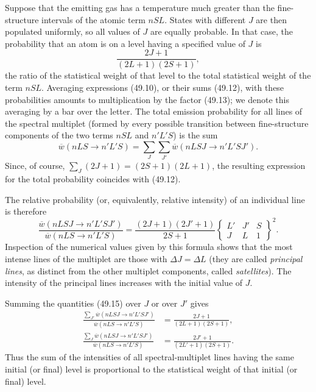 Suppose that the emitting gas has a temperature much greater than the fine-structure intervals of the atomic term $nSL$. States with different $J$ are then populated uniformly, so all values of $J$ are equally probable. In that case, the probability that an atom is on a level having a specified value of $J$ is
\begin{equation}
\frac{2J+1}{(2L+1)(2S+1)},
\tag{49.13}
\end{equation}
the ratio of the statistical weight of that level to the total statistical weight of the term $nSL$. Averaging expressions (49.10), or their sums (49.12), with these probabilities amounts to multiplication by the factor (49.13); we denote this averaging by a bar over the letter. The total emission probability for all lines of the spectral multiplet (formed by every possible transition between fine-structure components of the two terms $nSL$ and $n'L'S$) is the sum
\begin{equation}
\overline w(nLS\to n'L'S)=\sum_J\sum_{J'}
\overline w(nLSJ\to n'L'SJ').
\tag{49.14}
\end{equation}
Since, of course, $\sum_J(2J+1)=(2S+1)(2L+1)$, the resulting expression for the total probability coincides with (49.12).

The relative probability (or, equivalently, relative intensity) of an individual line is therefore
\begin{equation}
\frac{\overline w(nLSJ\to n'L'SJ')}{\overline w(nLS\to n'L'S)}
=\frac{(2J+1)(2J'+1)}{2S+1}
\begin{Bmatrix}L'&J'&S\\J&L&1\end{Bmatrix}^{\!2}.
\tag{49.15}
\end{equation}
Inspection of the numerical values given by this formula shows that the most intense lines of the multiplet are those with $\Delta J=\Delta L$ (they are called \emph{principal lines}, as distinct from the other multiplet components, called \emph{satellites}). The intensity of the principal lines increases with the initial value of $J$.

Summing the quantities (49.15) over $J$ or over $J'$ gives
\begin{equation}
\begin{aligned}
\frac{\sum_{J'}\overline w(nLSJ\to n'L'SJ')}{\overline w(nLS\to n'L'S)}
&=\frac{2J+1}{(2L+1)(2S+1)},\\
\frac{\sum_J\overline w(nLSJ\to n'L'SJ')}{\overline w(nLS\to n'L'S)}
&=\frac{2J'+1}{(2L'+1)(2S+1)}.
\end{aligned}
\tag{49.16}
\end{equation}
Thus the sum of the intensities of all spectral-multiplet lines having the same initial (or final) level is proportional to the statistical weight of that initial (or final) level.

